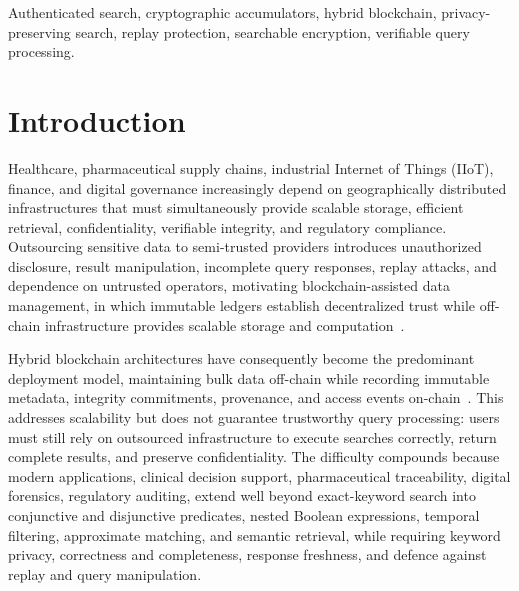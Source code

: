 \documentclass[journal]{IEEEtran}
\theoremstyle{tight}
\theoremstyle{remark}
\theoremstyle{plain}
\begin{document}
 
\begin{IEEEkeywords}
Authenticated search, cryptographic accumulators, hybrid blockchain, privacy-preserving search, replay protection, searchable encryption, verifiable query processing.
\end{IEEEkeywords}
 
\section{Introduction}
\label{sec:intro}
 
Healthcare, pharmaceutical supply chains, industrial Internet of Things (IIoT), finance, and digital governance increasingly depend on geographically distributed infrastructures that must simultaneously provide scalable storage, efficient retrieval, confidentiality, verifiable integrity, and regulatory compliance. Outsourcing sensitive data to semi-trusted providers introduces unauthorized disclosure, result manipulation, incomplete query responses, replay attacks, and dependence on untrusted operators, motivating blockchain-assisted data management, in which immutable ledgers establish decentralized trust while off-chain infrastructure provides scalable storage and computation~\cite{Asiamah,Lai,Li}.
 
Hybrid blockchain architectures have consequently become the predominant deployment model, maintaining bulk data off-chain while recording immutable metadata, integrity commitments, provenance, and access events on-chain~\cite{Li,Zhou,Yang}. This addresses scalability but does not guarantee trustworthy query processing: users must still rely on outsourced infrastructure to execute searches correctly, return complete results, and preserve confidentiality. The difficulty compounds because modern applications, clinical decision support, pharmaceutical traceability, digital forensics, regulatory auditing, extend well beyond exact-keyword search into conjunctive and disjunctive predicates, nested Boolean expressions, temporal filtering, approximate matching, and semantic retrieval, while requiring keyword privacy, correctness and completeness, response freshness, and defence against replay and query manipulation.
 
\end{document}
